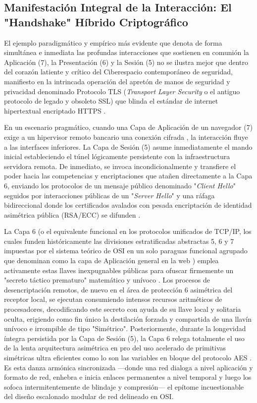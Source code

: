 \documentclass[a4paper,12pt]{article}
\begin{document}
\subsection*{Manifestación Integral de la Interacción: El "Handshake" Híbrido Criptográfico}

El ejemplo paradigmático y empírico más evidente que denota de forma simultánea e inmediata las profundas interacciones que sostienen en comunión la Aplicación (7), la Presentación (6) y la Sesión (5) no se ilustra mejor que dentro del corazón latiente y crítico del Ciberespacio contemporáneo de seguridad, manifiesto en la intrincada operación del apretón de manos de seguridad y privacidad denominado Protocolo TLS (\textit{Transport Layer Security} o el antiguo protocolo de legado y obsoleto SSL) que blinda el estándar de internet hipertextual encriptado HTTPS \cite{avast_tls, aws_ssl}. 

En un escenario pragmático, cuando una Capa de Aplicación de un navegador (7) exige a un hipervisor remoto bancario una conexión cifrada \cite{cloudflare_ssl}, la interacción fluye a las interfaces inferiores. La Capa de Sesión (5) asume inmediatamente el mando inicial estableciendo el túnel lógicamente persistente con la infraestructura servidora remota. De inmediato, se invoca incondicionalmente y transfiere el poder hacia las competencias y encriptaciones que atañen directamente a la Capa 6, enviando los protocolos de un mensaje público denominado "\textit{Client Hello}" seguidos por interacciones públicas de un "\textit{Server Hello}" y una ráfaga bidireccional donde los certificados avalados con pesada encriptación de identidad asimétrica pública (RSA/ECC) se difunden \cite{avast_tls, aws_ssl}. 

La Capa 6 (o el equivalente funcional en los protocolos unificados de TCP/IP, los cuales funden históricamente las divisiones estratificadas abstractas 5, 6 y 7 impuestas por el sistema teórico de OSI en un solo paraguas funcional agrupado que denominan como la capa de Aplicación general en la web \cite{ibm_osi_layer6, paloalto_l7}) emplea activamente estas llaves inexpugnables públicas para ofuscar firmemente un "secreto táctico prematuro" matemático y unívoco \cite{avast_tls, aws_ssl}. Los procesos de desencriptación remotos, de nuevo en el área de protección 6 asimétrica del receptor local, se ejecutan consumiendo intensos recursos aritméticos de procesadores, decodificando este secreto con ayuda de su llave local y solitaria oculta, erigiendo como fin único la destilación forzada y compartida de una llavín unívoco e irrompible de tipo "Simétrico". Posteriormente, durante la longevidad íntegra persistida por la Capa de Sesión (5), la Capa 6 relega totalmente el uso de la lenta arquitectura asimétrica en pro del uso acelerado de primitivas simétricas ultra eficientes como lo son las variables en bloque del protocolo AES \cite{aws_ssl, avast_tls}. Es esta danza armónica sincronizada —donde una red dialoga a nivel aplicación y formato de red, enhebra e inicia enlaces permanentes a nivel temporal y luego los sofoca intermitentemente de blindaje y compresión— el epítome incuestionable del diseño escalonado modular de red delineado en OSI.
\end{document}

